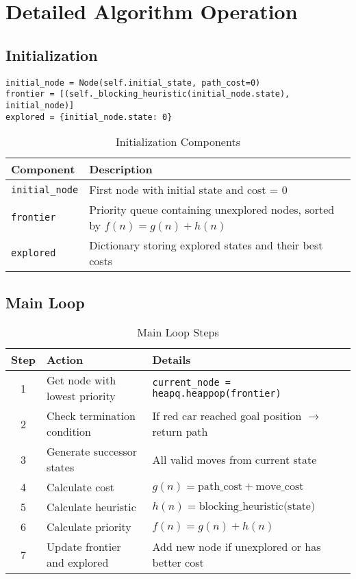 \documentclass[12pt,a4paper]{article}
\begin{document}
\section{Detailed Algorithm Operation}

\subsection{Initialization}

\begin{lstlisting}[caption=Initialization Code]
initial_node = Node(self.initial_state, path_cost=0)
frontier = [(self._blocking_heuristic(initial_node.state), initial_node)]
explored = {initial_node.state: 0}
\end{lstlisting}

\begin{table}[h!]
\centering
\begin{tabular}{|l|p{8cm}|}
\hline
\textbf{Component} & \textbf{Description} \\
\hline
\texttt{initial\_node} & First node with initial state and cost = 0 \\
\hline
\texttt{frontier} & Priority queue containing unexplored nodes, sorted by $f(n) = g(n) + h(n)$ \\
\hline
\texttt{explored} & Dictionary storing explored states and their best costs \\
\hline
\end{tabular}
\caption{Initialization Components}
\end{table}

\subsection{Main Loop}

\begin{table}[h!]
\centering
\begin{tabular}{|c|p{4cm}|p{6cm}|}
\hline
\textbf{Step} & \textbf{Action} & \textbf{Details} \\
\hline
1 & Get node with lowest priority & \texttt{current\_node = heapq.heappop(frontier)} \\
\hline
2 & Check termination condition & If red car reached goal position $\rightarrow$ return path \\
\hline
3 & Generate successor states & All valid moves from current state \\
\hline
4 & Calculate cost & $g(n) = \text{path\_cost} + \text{move\_cost}$ \\
\hline
5 & Calculate heuristic & $h(n) = \text{blocking\_heuristic(state)}$ \\
\hline
6 & Calculate priority & $f(n) = g(n) + h(n)$ \\
\hline
7 & Update frontier and explored & Add new node if unexplored or has better cost \\
\hline
\end{tabular}
\caption{Main Loop Steps}
\end{table}
\end{document}
